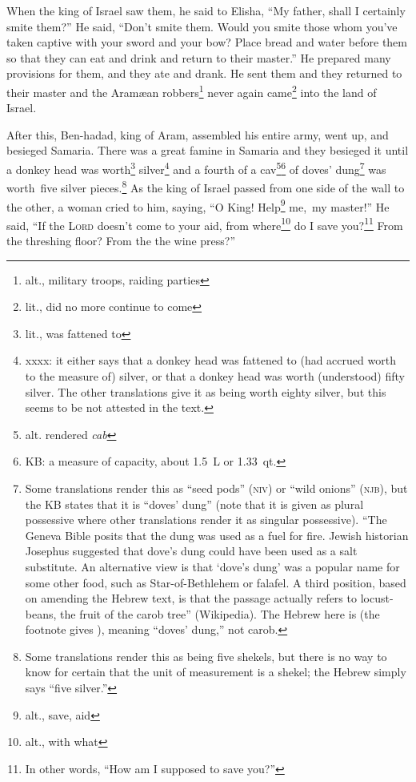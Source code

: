 \begin{inparaenum}
     When the king of Israel saw them, he said to Elisha, ``My father, shall I certainly smite them?''%
     He said, ``Don't smite them. Would you smite those whom you've taken captive with your sword and your bow? Place bread and water before them so that they can eat and drink and return to their master.''%
     He prepared many provisions for them, and they ate and drank. He sent them and they returned to their master and the Aram\ae{}an robbers\footnote{alt., military troops, raiding parties} never again came\footnote{lit., did no more continue to come} into the land of Israel.%
    
     After this, Ben-hadad, king of Aram, assembled his entire army, went up, and besieged Samaria.%
     There was a great famine in Samaria and they besieged it until a donkey head was worth\footnote{lit., was fattened to} silver\footnote{xxxx: it either says that a donkey head was fattened to (had accrued worth to the measure of) silver, or that a donkey head was worth (understood) fifty silver. The other translations give it as being worth eighty silver, but this seems to be not attested in the text.} and a fourth of a cav\footnote{alt. rendered \textit{cab}}\footnote{KB: a measure of capacity, about 1.5~L or 1.33~qt.} of doves' dung\footnote{Some translations render this as ``seed pods'' (\textsc{niv}) or ``wild onions'' (\textsc{njb}), but the KB states that it is ``doves' dung'' (note that it is given as plural possessive where other translations render it as singular possessive). ``The Geneva Bible posits that the dung was used as a fuel for fire. Jewish historian Josephus suggested that dove's dung could have been used as a salt substitute. An alternative view is that `dove's dung' was a popular name for some other food, such as Star-of-Bethlehem or falafel. A third position, based on amending the Hebrew text, is that the passage actually refers to locust-beans, the fruit of the carob tree'' (Wikipedia). The Hebrew here is  (the footnote gives ), meaning ``doves' dung,'' not carob.} was worth\understood\ five silver pieces.\footnote{Some translations render this as being five shekels, but there is no way to know for certain that the unit of measurement is a shekel; the Hebrew simply says ``five silver.''}%
     As the king of Israel passed from one side of the wall to the other, a woman cried to him, saying, ``O King! Help\footnote{alt., save, aid} me,\understood\ my master!''%
     He said, ``If the \textsc{Lord} doesn't come to your aid, from where\footnote{alt., with what} do I save you?\footnote{In other words, ``How am I supposed to save you?''} From the threshing floor? From the the wine press?''%

\end{inparaenum}
